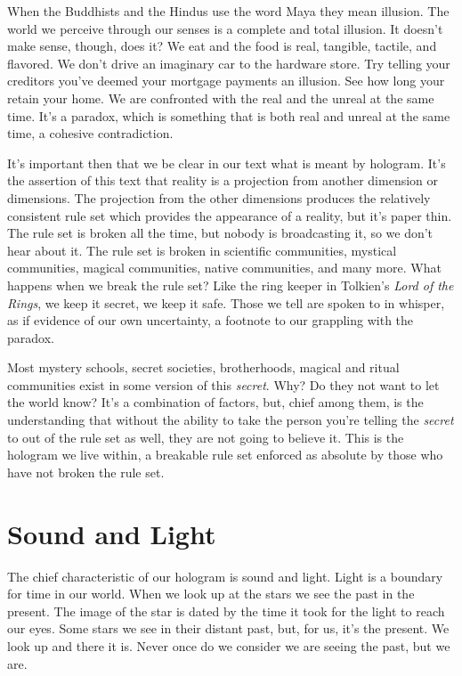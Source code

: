 \documentclass[letterpaper,11pt,twoside,titlepage,onecolumn,openany]{book}
\begin{document}
When the Buddhists and the Hindus use the word Maya they mean illusion.
The world we perceive through our senses is a complete and total
illusion. It doesn't make sense, though, does it? We eat and the food is
real, tangible, tactile, and flavored. We don't drive an imaginary car
to the hardware store. Try telling your creditors you've deemed your
mortgage payments an illusion. See how long your retain your home. We
are confronted with the real and the unreal at the same time. It's a
paradox, which is something that is both real and unreal at the same
time, a cohesive contradiction.

It's important then that we be clear in our text what is meant by
hologram. It's the assertion of this text that reality is a projection
from another dimension or dimensions. The projection from the other
dimensions produces the relatively consistent rule set which provides
the appearance of a reality, but it's paper thin. The rule set is broken
all the time, but nobody is broadcasting it, so we don't hear about it.
The rule set is broken in scientific communities, mystical communities,
magical communities, native communities, and many more. What happens
when we break the rule set? Like the ring keeper in Tolkien's \emph{Lord
of the Rings}, we keep it secret, we keep it safe. Those we tell are
spoken to in whisper, as if evidence of our own uncertainty, a footnote
to our grappling with the paradox.

Most mystery schools, secret societies, brotherhoods, magical and ritual
communities exist in some version of this \emph{secret}. Why? Do they
not want to let the world know? It's a combination of factors, but,
chief among them, is the understanding that without the ability to take
the person you're telling the \emph{secret} to out of the rule set as
well, they are not going to believe it. This is the hologram we live
within, a breakable rule set enforced as absolute by those who have not
broken the rule set.

\section*{Sound and Light}\label{sound-and-light}

The chief characteristic of our hologram is sound and light. Light is a
boundary for time in our world. When we look up at the stars we see the
past in the present. The image of the star is dated by the time it took
for the light to reach our eyes. Some stars we see in their distant
past, but, for us, it's the present. We look up and there it is. Never
once do we consider we are seeing the past, but we are.
\end{document}
